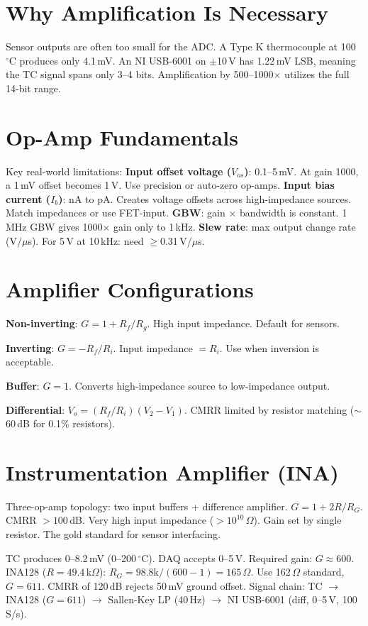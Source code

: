 \documentclass[11pt,letterpaper,twoside,openany]{book}
\newcommand{\degC}{\ensuremath{{}^{\circ}\text{C}}}
\begin{document}
\section{Why Amplification Is Necessary}
Sensor outputs are often too small for the ADC. A Type K thermocouple at 100\,\degC{} produces only 4.1\,mV. An NI USB-6001 on $\pm$10\,V has 1.22\,mV LSB, meaning the TC signal spans only 3--4 bits. Amplification by 500--1000$\times$ utilizes the full 14-bit range.

\section{Op-Amp Fundamentals}
Key real-world limitations: \textbf{Input offset voltage ($V_{os}$)}: 0.1--5\,mV. At gain 1000, a 1\,mV offset becomes 1\,V. Use precision or auto-zero op-amps. \textbf{Input bias current ($I_b$)}: nA to pA. Creates voltage offsets across high-impedance sources. Match impedances or use FET-input. \textbf{GBW}: gain $\times$ bandwidth is constant. 1\,MHz GBW gives 1000$\times$ gain only to 1\,kHz. \textbf{Slew rate}: max output change rate (V/$\mu$s). For 5\,V at 10\,kHz: need $\geq$0.31\,V/$\mu$s.

\section{Amplifier Configurations}
\textbf{Non-inverting}: $G = 1 + R_f/R_g$. High input impedance. Default for sensors.

\textbf{Inverting}: $G = -R_f/R_i$. Input impedance $= R_i$. Use when inversion is acceptable.

\textbf{Buffer}: $G = 1$. Converts high-impedance source to low-impedance output.

\textbf{Differential}: $V_o = (R_f/R_i)(V_2 - V_1)$. CMRR limited by resistor matching ($\sim$60\,dB for 0.1\% resistors).

\section{Instrumentation Amplifier (INA)}
Three-op-amp topology: two input buffers + difference amplifier. $G = 1 + 2R/R_G$. CMRR $> 100$\,dB. Very high input impedance ($>10^{10}\,\Omega$). Gain set by single resistor. The gold standard for sensor interfacing.

\begin{examplebox}
TC produces 0--8.2\,mV (0--200\,\degC{}). DAQ accepts 0--5\,V. Required gain: $G \approx 600$. INA128 ($R = 49.4$\,k$\Omega$): $R_G = 98.8\text{k}/(600-1) = 165\,\Omega$. Use 162\,$\Omega$ standard, $G = 611$. CMRR of 120\,dB rejects 50\,mV ground offset. Signal chain: TC $\to$ INA128 ($G = 611$) $\to$ Sallen-Key LP (40\,Hz) $\to$ NI USB-6001 (diff, 0--5\,V, 100\,S/s).
\end{examplebox}
\end{document}
